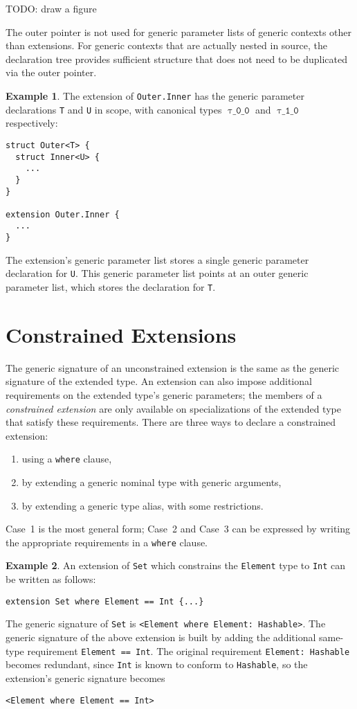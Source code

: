 \documentclass[a4paper,headsepline,bibliography=totoc,toc=flat,fleqn,twoside=semi]{scrbook}
\theoremstyle{definition}
\theoremstyle{definition}
\newtheorem{example}{Example}[chapter]
\theoremstyle{definition}
\newcommand{\ttgp}[2]{\texttt{$\uptau$\_#1\_#2}}
\newcommand{\ifWIP}{\iffalse}
\begin{document}
TODO: draw a figure

The outer pointer is not used for generic parameter lists of generic contexts other than extensions. For generic contexts that are actually nested in source, the declaration tree provides sufficient structure that does not need to be duplicated via the outer pointer.

\begin{example}
The extension of \texttt{Outer.Inner} has the generic parameter declarations \texttt{T} and \texttt{U} in scope, with canonical types $\ttgp{0}{0}$ and $\ttgp{1}{0}$ respectively:
\begin{Verbatim}
struct Outer<T> {
  struct Inner<U> {
    ...
  }
}

extension Outer.Inner {
  ...
}
\end{Verbatim}
The extension's generic parameter list stores a single generic parameter declaration for \texttt{U}. This generic parameter list points at an outer generic parameter list, which stores the declaration for \texttt{T}.
\end{example}
\fi

\section{Constrained Extensions}\label{constrained extensions}

\ifWIP
The generic signature of an unconstrained extension is the same as the generic signature of the extended type. An extension can also impose additional requirements on the extended type's generic parameters; the members of a \emph{constrained extension} are only available on specializations of the extended type that satisfy these requirements. There are three ways to declare a constrained extension:
\begin{enumerate}
\item using a \texttt{where} clause,
\item by extending a generic nominal type with generic arguments,
\item by extending a generic type alias, with some restrictions.
\end{enumerate}
Case~1 is the most general form; Case~2 and Case~3 can be expressed by writing the appropriate requirements in a \texttt{where} clause.

\begin{example}
An extension of \texttt{Set} which constrains the \texttt{Element} type to \texttt{Int} can be written as follows:
\begin{Verbatim}
extension Set where Element == Int {...}
\end{Verbatim}
The generic signature of \texttt{Set} is \texttt{<Element where Element:\ Hashable>}. The generic signature of the above extension is built by adding the additional same-type requirement \texttt{Element == Int}. The original requirement \texttt{Element:\ Hashable} becomes redundant, since \texttt{Int} is known to conform to \texttt{Hashable}, so the extension's generic signature becomes
\begin{Verbatim}
<Element where Element == Int>
\end{Verbatim}
\end{example}
\end{document}
